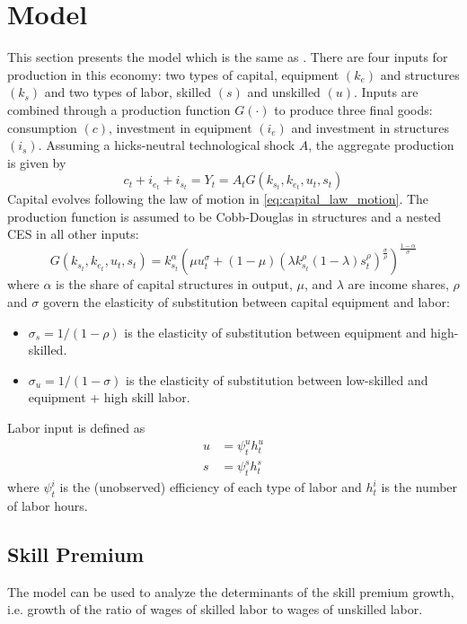 \documentclass[12pt]{article}
\begin{document}
\section{Model}\label{sec:model}
This section presents the model which is the same as \citep{krusell2000capital}. There are four inputs for production in this economy: two types of capital, equipment $(k_e)$ and structures $(k_s)$ and two types of labor, skilled $(s)$ and unskilled $(u)$. Inputs are combined through a production function $G(\cdot)$ to produce three final goods: consumption $(c)$, investment in equipment $(i_e)$ and investment in structures $(i_s)$. Assuming a hicks-neutral technological shock $A$, the aggregate production is given by
\begin{equation}\label{eq:production}
 c_t + i_{e_t} + i_{s_t} = Y_t = A_t G(k_{s_t}, k_{e_t}, u_t, s_t)
\end{equation}
Capital evolves following the law of motion in \eqref{eq:capital_law_motion}. The production function is assumed to be Cobb-Douglas in structures and a nested CES in all other inputs:
\begin{equation}\label{eq:production_fun}
 G(k_{s_t}, k_{e_t}, u_t, s_t) = k_{s_t}^\alpha\left( \mu u_t^\sigma + (1-\mu)\left(\lambda k_{s_t}^\rho (1-\lambda)s_t^\rho\right)^\frac{\sigma}{\rho}\right)^\frac{1-\alpha}{\sigma}
\end{equation}
where $\alpha$ is the share of capital structures in output, $\mu$, and $\lambda$ are income shares, $\rho$ and $\sigma$ govern the elasticity of substitution between capital equipment and labor:
\begin{itemize}
 \item $\sigma_s = 1/(1-\rho)$ is the elasticity of substitution between equipment and high-skilled.
 \item $\sigma_u = 1/(1-\sigma)$ is the elasticity of substitution between low-skilled and equipment + high skill labor.
\end{itemize}
Labor input is defined as 
\begin{align*}
 u &= \psi^u_t h^u_t\\
 s &= \psi^s_t h^s_t
\end{align*}
where $\psi^i_t$ is the (unobserved) efficiency of each type of labor and $h^i_t$ is the number of labor hours. 

\subsection{Skill Premium}
The model can be used to analyze the determinants of the skill premium growth, i.e. growth of the ratio of wages of skilled labor to wages of unskilled labor. 
\end{document}
